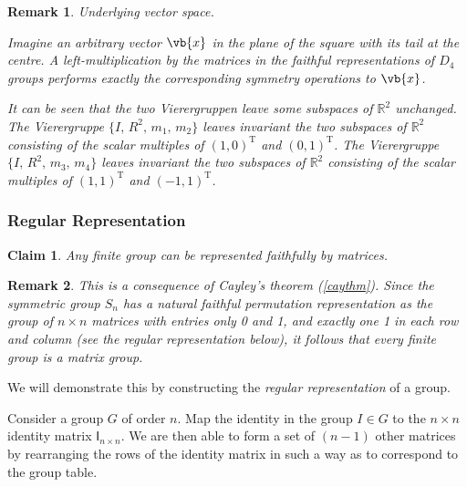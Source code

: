 \documentclass{article}
\theoremstyle{plain}\theoremheaderfont{\normalfont\itshape}\theorembodyfont{\rmfamily}\theoremseparator{.}\newtheorem*{rem}{Remark}\newtheorem*{ex}{Example}\newtheorem*{proof}{Proof}\newtheorem*{altp}{Alternative proof}
\theoremstyle{plain}\theoremheaderfont{\normalfont\bfseries}\theorembodyfont{\rmfamily}\theoremseparator{.}\newtheorem{thm}{Theorem}[section]\newtheorem{lem}[thm]{Lemma}\newtheorem{prop}[thm]{Proposition}\newtheorem*{cor}{Corollary}\newtheorem{defn}[thm]{Definition}\newtheorem{clm}[thm]{Claim}\newtheorem{clminproof}{Claim}
\theoremstyle{break}\theoremheaderfont{\normalfont\itshape}\theorembodyfont{\rmfamily}\theoremseparator{.\medskip}\newtheorem*{proofskip}{Proof}\newtheorem*{exs}{Examples}\newtheorem*{rems}{Remarks}
\theoremstyle{break}\theoremheaderfont{\normalfont\bfseries}\theorembodyfont{\rmfamily}\theoremseparator{.\medskip}\newtheorem{lemskip}[thm]{Lemma}\newtheorem{defnskip}[thm]{Definition}\newtheorem{propskip}[thm]{Proposition}\newtheorem{thmskip}[thm]{Theorem}
\numberwithin{equation}{section}
\begin{document}
	\begin{rem}
		\textit{Underlying vector space.}
		
		Imagine an arbitrary vector \(\vb{x}\) in the plane of the square with its tail at the centre. A left-multiplication by the matrices in the faithful representations of \(D_4\) groups performs exactly the corresponding symmetry operations to \(\vb{x}\).

		It can be seen that the two Vierergruppen leave some subspaces of \(\mathbb{R}^2\) unchanged. The Vierergruppe \(\{I,\, R^2,\, m_1,\, m_2\}\) leaves invariant the two subspaces of \(\mathbb{R}^2\) consisting of the scalar multiples of \((1,0)^{\mathrm{T}}\) and \((0,1)^{\mathrm{T}}\). The Vierergruppe \(\{I,\, R^2,\, m_3,\, m_4\}\) leaves invariant the two subspaces of \(\mathbb{R}^2\) consisting of the scalar multiples of \((1,1)^{\mathrm{T}}\) and \((-1,1)^{\mathrm{T}}\). 
	\end{rem}

	\subsubsection{Regular Representation}
	\begin{clm}
		Any finite group can be represented faithfully by matrices.
	\end{clm}
	\begin{rem}
		This is a consequence of Cayley's theorem (\cref{caythm}). Since the symmetric group \(S_n\) has a natural faithful permutation representation as the group of \(n\times n\) matrices with entries only 0 and 1, and exactly one 1 in each row and column (see the regular representation below), it follows that every finite group is a matrix group.
	\end{rem}

	We will demonstrate this by constructing the \textit{regular representation} of a group.

	Consider a group \(G\) of order \(n\). Map the identity in the group \(I\in G\) to the \(n\times n\) identity matrix \(\mathsf{I}_{n\times n}\). We are then able to form a set of \((n-1)\) other matrices by rearranging the rows of the identity matrix in such a way as to correspond to the group table.
\end{document}
